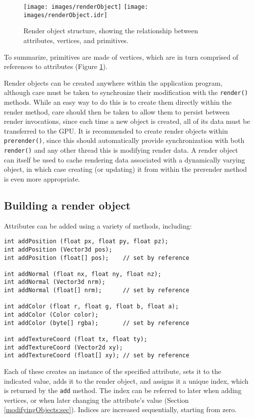 %
\begin{figure}[t]
\begin{center}
\iflatexml
 \texttt{[image: images/renderObject]}
\else
 \texttt{[image: images/renderObject.idr]}
\fi
\end{center}
\caption{Render object structure, showing the relationship between
attributes, vertices, and primitives.}
\label{renderObject:fig}
\end{figure}
%

To summarize, primitives are made of vertices, which are in turn
comprised of references to attributes (Figure \ref{renderObject:fig}).

Render objects can be created anywhere within the application program,
although care must be taken to synchronize their modification with the
{\tt render()} methods. While an easy way to do this is to create them
directly within the render method, care should then be taken to allow
them to persist between render invocations, since each time a new
object is created, all of its data must be transferred to the GPU. It
is recommended to create render objects within {\tt prerender()},
since this should automatically provide synchronization with both {\tt
render()} and any other thread this is modifying render data.  A
render object can itself be used to cache rendering data associated
with a dynamically varying object, in which case creating (or
updating) it from within the prerender method is even more
appropriate.

\subsection{Building a render object}
\label{buildingRenderObjects:sec}

Attributes can be added using a variety of
 methods, including:
%
\begin{lstlisting}[]
int addPosition (float px, float py, float pz);
int addPosition (Vector3d pos);
int addPosition (float[] pos);    // set by reference

int addNormal (float nx, float ny, float nz);
int addNormal (Vector3d nrm);
int addNormal (float[] nrm);      // set by reference

int addColor (float r, float g, float b, float a);
int addColor (Color color);
int addColor (byte[] rgba);       // set by reference

int addTextureCoord (float tx, float ty);
int addTextureCoord (Vector2d xy);
int addTextureCoord (float[] xy); // set by reference
\end{lstlisting}
%
Each of these creates an instance of the specified attribute, sets it
to the indicated value, adds it to the render object, and assigns it a
unique index, which is returned by the {\tt add} method. The index can
be referred to later when adding vertices, or when later changing the
attribute's value (Section \ref{modifyingObjects:sec}). Indices are
increased sequentially, starting from zero.

